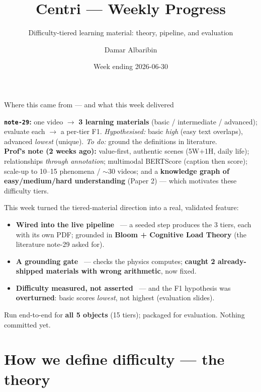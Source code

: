 \documentclass[aspectratio=169,10pt]{beamer}
\title{Centri --- Weekly Progress}
\subtitle{Difficulty-tiered learning material: theory, pipeline, and evaluation}
\author{Damar Albaribin}
\institute{MSc Thesis --- advisor: Prof.\ Wu-Yuin Hwang}
\date{Week ending 2026-06-30}
\newcommand{\hl}[1]{{\bfseries\color{cAccent}#1}}
\newcommand{\ok}{{\color{cApp}\textbf{\checkmark}}}
\begin{document}
\maketitle

\begin{frame}{Where this came from --- and what this week delivered}
\small
\begin{tcolorbox}[colback=cGrey!8,colframe=cGrey,title=\footnotesize Context --- two inputs,boxsep=2pt,left=4pt,right=4pt]
\scriptsize
\textbf{\texttt{note-29}:} one video $\rightarrow$ \textbf{3 learning materials} (basic / intermediate /
advanced); evaluate each $\rightarrow$ a per-tier F1. \emph{Hypothesised:} basic \emph{high} (easy text
overlaps), advanced \emph{lowest} (unique). \emph{To do:} ground the definitions in literature.\\[2pt]
\textbf{Prof's note (2 weeks ago):} value-first, authentic scenes (5W$+$1H, daily life); relationships
\emph{through annotation}; multimodal BERTScore (caption then score); scale-up to 10--15 phenomena /
$\sim$30 videos; and a \textbf{knowledge graph of easy/medium/hard understanding} (Paper 2)
--- which motivates these difficulty tiers.
\end{tcolorbox}
\vspace{0.2em}
This week turned the tiered-material direction into a real, validated feature:
\begin{itemize}\setlength\itemsep{1pt}
  \item \textbf{\color{cMeas}Wired into the live pipeline} \ok\ --- a seeded step produces the 3 tiers,
  each with its own PDF; grounded in \textbf{Bloom + Cognitive Load Theory} (the literature note-29 asked for).
  \item \textbf{\color{cPed}A grounding gate} \ok\ --- checks the physics computes; \hl{caught 2 already-shipped
  materials with wrong arithmetic}, now fixed.
  \item \textbf{\color{cApp}Difficulty measured, not asserted} \ok\ --- and the F1 hypothesis was
  \hl{overturned}: basic scores \emph{lowest}, not highest (evaluation slides).
\end{itemize}
{\footnotesize Run end-to-end for \textbf{all 5 objects} (15 tiers); packaged for evaluation. Nothing committed yet.}
\end{frame}

\section{How we define difficulty --- the theory}
\end{document}
